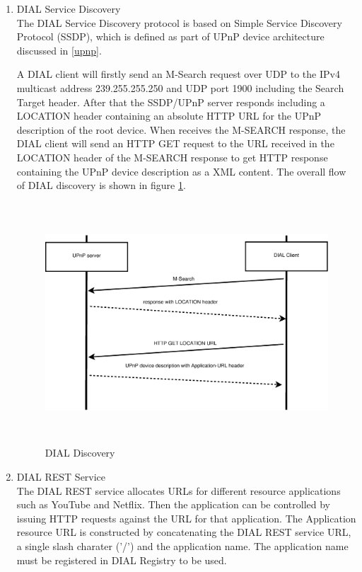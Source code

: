 \begin{enumerate} 
\item DIAL Service Discovery \\ 
The DIAL Service Discovery protocol is based on Simple Service Discovery 
Protocol (SSDP), which is defined as part of UPnP device architecture discussed 
in \ref{upnp}. 

A DIAL client will firstly send an M-Search request over UDP to the IPv4 
multicast address 239.255.255.250 and UDP port 1900 including the Search Target 
header. After that the SSDP/UPnP server responds including a LOCATION header 
containing an absolute HTTP URL for the UPnP description of the root device. 
When receives the M-SEARCH response, the DIAL client will send an HTTP GET 
request to the URL received in the LOCATION header of the M-SEARCH response to 
get HTTP response containing the UPnP device description as a XML content. The 
overall flow of DIAL discovery is shown in figure \ref{dial_discovery}. 

\begin{figure}[htb] \centering 
\includegraphics[height=9cm]{charts/dial_discovery} 
\caption{DIAL Discovery \label{dial_discovery}} 
\end{figure} 

\item DIAL REST Service \\ 
The DIAL REST service allocates URLs for different resource applications such as 
YouTube and Netflix. Then the application can be controlled by issuing HTTP 
requests against the URL for that application. The Application resource URL is 
constructed by concatenating the DIAL REST service URL, a single slash charater 
('/') and the application name. The application name must be registered in DIAL 
Registry to be used. 


\end{enumerate}
